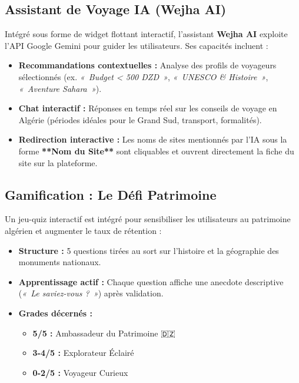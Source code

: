 \documentclass[11pt,a4paper]{article}
\begin{document}
\subsection{Assistant de Voyage IA (Wejha AI)}
Intégré sous forme de widget flottant interactif, l'assistant \textbf{Wejha AI} exploite l'API Google Gemini pour guider les utilisateurs. Ses capacités incluent :
\begin{itemize}
    \item \textbf{Recommandations contextuelles :} Analyse des profils de voyageurs sélectionnés (ex. \textit{«~Budget < 500 DZD~»}, \textit{«~UNESCO \& Histoire~»}, \textit{«~Aventure Sahara~»}).
    \item \textbf{Chat interactif :} Réponses en temps réel sur les conseils de voyage en Algérie (périodes idéales pour le Grand Sud, transport, formalités).
    \item \textbf{Redirection interactive :} Les noms de sites mentionnés par l'IA sous la forme \textbf{**Nom du Site**} sont cliquables et ouvrent directement la fiche du site sur la plateforme.
\end{itemize}

\subsection{Gamification : Le Défi Patrimoine}
Un jeu-quiz interactif est intégré pour sensibiliser les utilisateurs au patrimoine algérien et augmenter le taux de rétention :
\begin{itemize}
    \item \textbf{Structure :} 5 questions tirées au sort sur l'histoire et la géographie des monuments nationaux.
    \item \textbf{Apprentissage actif :} Chaque question affiche une anecdote descriptive (\textit{«~Le saviez-vous ?~»}) après validation.
    \item \textbf{Grades décernés :}
        \begin{itemize}
            \item \textbf{5/5 :} Ambassadeur du Patrimoine 🇩🇿
            \item \textbf{3-4/5 :} Explorateur Éclairé
            \item \textbf{0-2/5 :} Voyageur Curieux
        \end{itemize}
\end{itemize}
\end{document}
